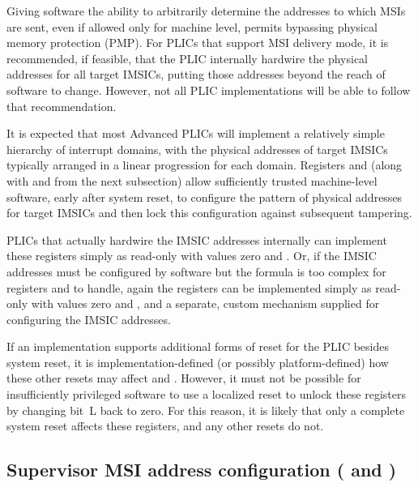 \begin{commentary}
Giving software the ability to arbitrarily determine the addresses to
which MSIs are sent, even if allowed only for machine level, permits
bypassing physical memory protection (PMP).
For PLICs that support MSI delivery mode, it is recommended, if
feasible, that the PLIC internally hardwire the physical addresses for
all target IMSICs, putting those addresses beyond the reach of software
to change.
However, not all PLIC implementations will be able to follow that
recommendation.

It is expected that most Advanced PLICs will implement a relatively
simple hierarchy of interrupt domains, with the physical addresses
of target IMSICs typically arranged in a linear progression for each
domain.
Registers  and  (along with
 and  from the next subsection) allow
sufficiently trusted machine-level software, early after system reset,
to configure the pattern of physical addresses for target IMSICs and
then lock this configuration against subsequent tampering.

PLICs that actually hardwire the IMSIC addresses internally
can implement these registers simply as read-only with values zero
and .
Or, if the IMSIC addresses must be configured by software but
the formula is too complex for registers  and
 to handle, again the registers can be implemented
simply as read-only with values zero and , and a
separate, custom mechanism supplied for configuring the IMSIC
addresses.
\end{commentary}

If an implementation supports additional forms of reset for the
PLIC besides system reset, it is implementation-defined (or possibly
platform-defined) how these other resets may affect  and
.
However, it must not be possible for insufficiently privileged software
to use a localized reset to unlock these registers by changing bit~L
back to zero.
For this reason, it is likely that only a complete system reset affects
these registers, and any other resets do not.

\subsection{%
Supervisor MSI address configuration
 ( and )%
}
\label{sec:AdvPLIC-reg-smsiaddrcfg}

